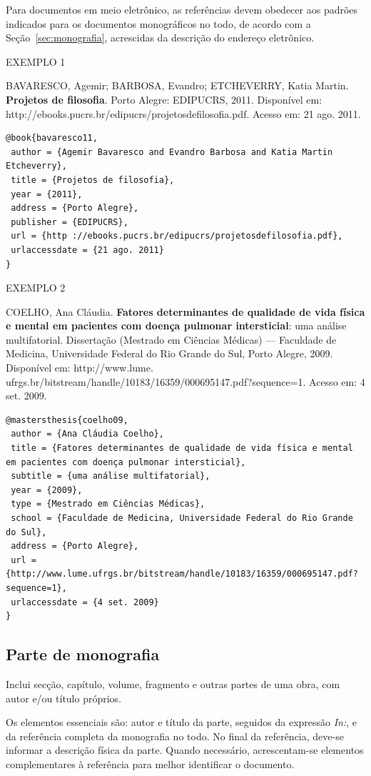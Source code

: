 Para documentos em meio eletrônico, as referências devem obedecer aos padrões indicados para os documentos monográficos no todo, de acordo com a Seção~\ref{sec:monografia}, acrescidas da descrição do endereço eletrônico.

EXEMPLO 1 

BAVARESCO, Agemir; BARBOSA, Evandro; ETCHEVERRY, Katia Martin. \textbf{Projetos de filosofia}. Porto Alegre: EDIPUCRS, 2011. Disponível em: http://ebooks.pucrs.br/edipucrs/projetosdefilosofia.pdf. Acesso em: 21 ago. 2011.

\begin{verbatim}
@book{bavaresco11,
 author = {Agemir Bavaresco and Evandro Barbosa and Katia Martin Etcheverry},
 title = {Projetos de filosofia},
 year = {2011},
 address = {Porto Alegre},
 publisher = {EDIPUCRS},
 url = {http ://ebooks.pucrs.br/edipucrs/projetosdefilosofia.pdf},
 urlaccessdate = {21 ago. 2011}
}
\end{verbatim}

EXEMPLO 2

COELHO, Ana Cláudia. \textbf{Fatores determinantes de qualidade de vida física e mental em pacientes com doença pulmonar intersticial}: uma análise multifatorial. Dissertação (Mestrado em Ciências Médicas) — Faculdade de Medicina, Universidade Federal do Rio Grande do Sul, Porto Alegre, 2009. Disponível em: http://www.lume. ufrgs.br/bitstream/handle/10183/16359/000695147.pdf?sequence=1. Acesso em: 4 set. 2009.

\begin{verbatim}
@mastersthesis{coelho09,
 author = {Ana Cláudia Coelho},
 title = {Fatores determinantes de qualidade de vida física e mental em pacientes com doença pulmonar intersticial},
 subtitle = {uma análise multifatorial},
 year = {2009},
 type = {Mestrado em Ciências Médicas},
 school = {Faculdade de Medicina, Universidade Federal do Rio Grande do Sul},
 address = {Porto Alegre},
 url = {http://www.lume.ufrgs.br/bitstream/handle/10183/16359/000695147.pdf?sequence=1},
 urlaccessdate = {4 set. 2009}
}
\end{verbatim}

\subsection{Parte de monografia}

Inclui secção, capítulo, volume, fragmento e outras partes de uma obra, com autor e/ou título próprios.

Os elementos essenciais são: autor e título da parte, seguidos da expressão \textit{In:}, e da referência completa da monografia no todo. No final da referência, deve-se informar a descrição física da parte. Quando necessário, acrescentam-se elementos complementares à referência para melhor identificar o documento.

